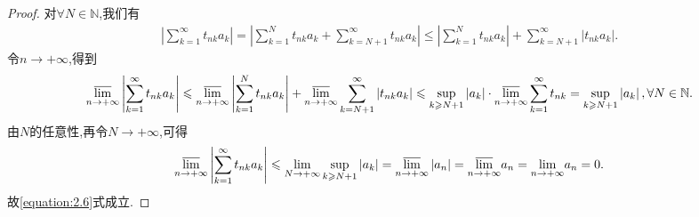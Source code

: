 \documentclass[../../main.tex]{subfiles}%
\begin{document}
\begin{proof}
对$\forall N\in\mathbb{N}$,我们有
\begin{align*}
\left| \sum\limits_{k=1}^{\infty}{t_{nk}a_k} \right|=\left| \sum\limits_{k=1}^N{t_{nk}a_k}+\sum\limits_{k=N+1}^{\infty}{t_{nk}a_k} \right|\leqslant \left| \sum\limits_{k=1}^N{t_{nk}a_k} \right|+\sum\limits_{k=N+1}^{\infty}{\left| t_{nk}a_k \right|}.
\end{align*}
令$n\to+\infty$,得到
\begin{align*}
\underset{n\rightarrow +\infty}{{\varlimsup }}\left| \sum\limits_{k=1}^{\infty}{t_{nk}a_k} \right|\leqslant \underset{n\rightarrow +\infty}{{\varlimsup }}\left| \sum\limits_{k=1}^N{t_{nk}a_k} \right|+\underset{n\rightarrow +\infty}{{\varlimsup }}\sum\limits_{k=N+1}^{\infty}{\left| t_{nk}a_k \right|}\leqslant \mathop {\mathrm{sup}} \limits_{k\geqslant N+1}\left| a_k \right|\cdot \underset{n\rightarrow +\infty}{{\varlimsup }}\sum\limits_{k=1}^{\infty}{t_{nk}}=\mathop {\mathrm{sup}} \limits_{k\geqslant N+1}\left| a_k \right|,\forall N\in \mathbb{N} .
\end{align*}
由$N$的任意性,再令$N\to+\infty$,可得
\begin{align*}
\underset{n\rightarrow +\infty}{{\varlimsup }}\left| \sum\limits_{k=1}^{\infty}{t_{nk}a_k} \right|\leqslant \underset{N\rightarrow +\infty}{\lim}\mathop {\mathrm{sup}} \limits_{k\geqslant N+1}\left| a_k \right|=\underset{n\rightarrow +\infty}{{\varlimsup }}\left| a_n \right|=\underset{n\rightarrow +\infty}{{\varlimsup }}a_n=\underset{n\rightarrow +\infty}{\lim}a_n=0.
\end{align*}
故\eqref{equation:2.6}式成立.

\end{proof}
\end{document}
